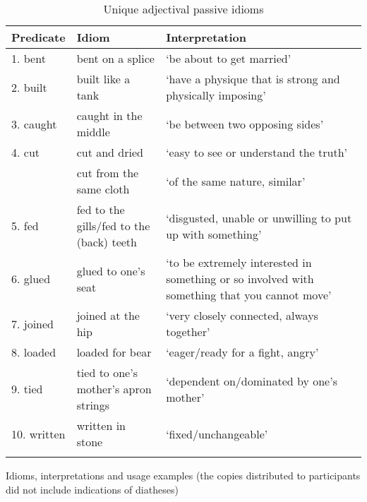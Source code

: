 \documentclass[output=paper]{langsci/langscibook}
\begin{document}
\begin{table}[p]
\small
\caption{Unique adjectival passive idioms}
\begin{tabularx}{\textwidth}{llQ}
\lsptoprule
{Predicate} & {Idiom} & {Interpretation}\\
\midrule
{1. bent}     & {bent on a splice}                             & ‘be about to get married’\\
{2. built}    & {built like a tank}                            & ‘have a physique that is strong and physically imposing’\\
{3. caught}   & {caught in the middle}                         & ‘be between two opposing sides’ \\
{4. cut}      & {cut and dried}                                & ‘easy to see or understand the truth’ \\
              & {cut from the same cloth}                      & ‘of the same nature, similar’ \\
{5. fed}      & {fed to the gills\slash fed to the (back) teeth } & ‘disgusted, unable or unwilling to put up with something’ \\
{6. glued}    & {glued to one’s seat}                          & ‘to be extremely interested in something or so involved with something that you cannot move’\\
{7. joined}   & {joined at the hip}                            & ‘very closely connected, always together’\\
{8. loaded}   & { loaded for bear}                             & ‘eager/ready for a fight, angry’\\
{9. tied}     & { tied to one’s mother’s apron strings}        & ‘dependent on/dominated by one’s mother’ \\
{10. written} & { written in stone}                            & ‘fixed/unchangeable’ \\
\lspbottomrule
\end{tabularx}
\end{table}

\clearpage
{}\label{app-14:b}


Idioms, interpretations and usage examples (the copies distributed
to participants did not include indications of diatheses)
\end{document}
